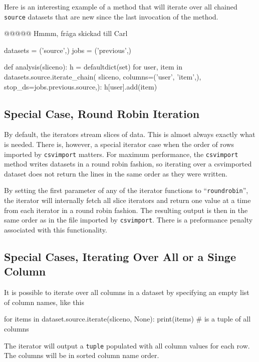 Here is an interesting example of a method that will iterate over all
chained \texttt{source} datasets that are new since the last
invocation of the method.

@@@@@  Hmmm, fråga skickad till Carl

\begin{python}
datasets = ('source',)
jobs = ('previous',)

def analysis(sliceno):
    h = defaultdict(set)
    for user, item in datasets.source.iterate_chain(
                           sliceno, columns=('user', 'item',),
                           stop_ds=jobs.previous.source,):
        h[user].add(item)
\end{python}



\subsection{Special Case, Round Robin Iteration}
By default, the iterators stream slices of data.  This is almost
always exactly what is needed.  There is, however, a special iterator
case when the order of rows imported by \texttt{csvimport} matters.
For maximum performance, the \texttt{csvimport} method writes datasets
in a round robin fashion, so iterating over a csvimported dataset does
not return the lines in the same order as they were written.

By setting the first parameter of any of the iterator functions to
``\texttt{roundrobin}'', the iterator will internally fetch all slice iterators
and return one value at a time from each iterator in a round robin
fashion.  The resulting output is then in the same order as in the
file imported by \texttt{csvimport}.  There is a preformance penalty
associated with this functionality.



\subsection{Special Cases, Iterating Over All or a Singe Column}
It is possible to iterate over all columns in a dataset by specifying
an empty list of column names, like this
\begin{python}
for items in dataset.source.iterate(sliceno, None):
    print(items)  # is a tuple of all columns
\end{python}
The iterator will output a \texttt{tuple} populated with all column
values for each row.  The columns will be in sorted column name order.

